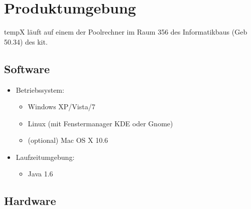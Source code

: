 \section{Produktumgebung}

\label{sec:produktumgebung}

\gls{tempX} läuft auf einem der Poolrechner im Raum 356 des Informatikbaus (Geb 50.34) des \gls{kit}.

\subsection{Software}

	\begin{itemize}
		
		\item Betriebssystem: 
		\begin{itemize}
			\item Windows XP/Vista/7
			\item Linux (mit Fenstermanager KDE oder Gnome)
			\item (optional) Mac OS X 10.6
		\end{itemize}
	
		\item Laufzeitumgebung:
		\begin{itemize}
			\item Java 1.6
		\end{itemize}
		
	\end{itemize}
	
\subsection{Hardware}

